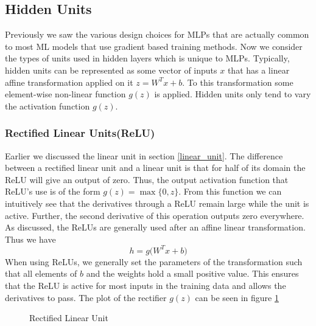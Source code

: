\documentclass[12pt]{extarticle}
\numberwithin{equation}{section}
\begin{document}
	\subsection{Hidden Units}
	Previously we saw the various design choices for MLPs that are actually common to most ML models that use gradient based training methods. Now we consider the types of units used in hidden layers which is unique to MLPs. Typically, hidden units can be represented as some vector of inputs $x$ that has a linear affine transformation applied on it $z = W^Tx + b$. To this transformation some element-wise non-linear function $g(z)$ is applied. Hidden units only tend to vary the activation function $g(z)$.
	\subsubsection{Rectified Linear Units(ReLU)}
	Earlier we discussed the linear unit in section \ref{linear_unit}. The difference between a rectified linear unit and a linear unit is that for half of its domain the ReLU will give an output of zero. Thus, the output activation function that ReLU's use is of the form $g(z) = \max \{0,z\}$. From this function we can intuitively see that the derivatives through a ReLU remain large while the unit is active. Further, the second derivative of this operation outputs zero everywhere. As discussed, the ReLUs are generally used after an affine linear transformation. Thus we have
	\begin{equation}
	h = g\big(W^Tx + b\big)
	\end{equation}
	When using ReLUs, we generally set the parameters of the transformation such that all elements of $b$ and the weights hold a small positive value. This ensures that the ReLU is active for most inputs in the training data and allows the derivatives to pass. The plot of the rectifier $g(z)$ can be seen in figure \ref{relu}
	\begin{figure}[H]
		\centering
		\setlength{\fboxsep}{5pt}%
		\setlength{\fboxrule}{1pt}%
		\caption{Rectified Linear Unit
			\label{relu}}
	\end{figure}
\end{document}
